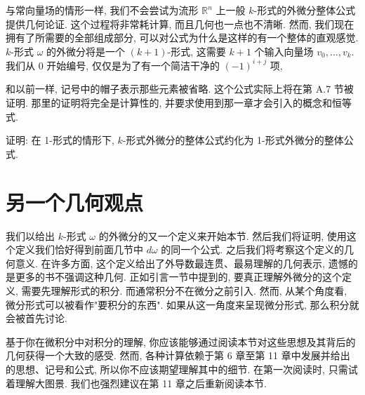 与常向量场的情形一样, 我们不会尝试为流形 $\mathbb{R}^n$ 上一般 $k$-形式的外微分整体公式提供几何论证. 这个过程将非常耗计算, 而且几何也一点也不清晰. 然而, 我们现在拥有了所需要的全部组成部分, 可以对公式为什么是这样的有一个整体的直观感觉. $k$-形式 $\omega$ 的外微分将是一个 $(k+1)$-形式, 这需要 $k+1$ 个输入向量场 $v_0,\ldots,v_k$. 我们从 0 开始编号, 仅仅是为了有一个简洁干净的 $(-1)^{i+j}$ 项, 
\begin{center}
\end{center}
和以前一样, 记号中的帽子表示那些元素被省略. 这个公式实际上将在第 A.7 节被证明. 那里的证明将完全是计算性的, 并要求使用到那一章才会引入的概念和恒等式.

\begin{question}\label{q:4-5}
证明: 在 1-形式的情形下, $k$-形式外微分的整体公式约化为 1-形式外微分的整体公式.
\end{question}

\section{另一个几何观点}

我们以给出 $k$-形式 $\omega$ 的外微分的又一个定义来开始本节. 然后我们将证明, 使用这个定义我们恰好得到前面几节中 $d\omega$ 的同一个公式. 之后我们将考察这个定义的几何意义. 在许多方面, 这个定义给出了外导数最连贯、最易理解的几何表示, 遗憾的是更多的书不强调这种几何. 正如引言一节中提到的, 要真正理解外微分的这个定义, 需要先理解形式的积分. 而通常积分不在微分之前引入. 然而, 从某个角度看, 微分形式可以被看作"要积分的东西". 如果从这一角度来呈现微分形式, 那么积分就会被首先讨论.

基于你在微积分中对积分的理解, 你应该能够通过阅读本节对这些思想及其背后的几何获得一个大致的感受. 然而, 各种计算依赖于第 6 章至第 11 章中发展并给出的思想、记号和公式, 所以你不应该期望理解其中的细节. 在第一次阅读时, 只需试着理解大图景. 我们也强烈建议在第 11 章之后重新阅读本节.

